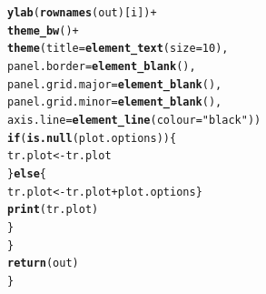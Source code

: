 \documentclass[12pt]{article}\usepackage[]{graphicx}\usepackage[]{color}
\makeatletter
\newcommand{\hlnum}[1]{\textcolor[rgb]{0.686,0.059,0.569}{#1}}%
\newcommand{\hlstr}[1]{\textcolor[rgb]{0.192,0.494,0.8}{#1}}%
\newcommand{\hlopt}[1]{\textcolor[rgb]{0,0,0}{#1}}%
\newcommand{\hlstd}[1]{\textcolor[rgb]{0.345,0.345,0.345}{#1}}%
\newcommand{\hlkwa}[1]{\textcolor[rgb]{0.161,0.373,0.58}{\textbf{#1}}}%
\newcommand{\hlkwb}[1]{\textcolor[rgb]{0.69,0.353,0.396}{#1}}%
\newcommand{\hlkwc}[1]{\textcolor[rgb]{0.333,0.667,0.333}{#1}}%
\newcommand{\hlkwd}[1]{\textcolor[rgb]{0.737,0.353,0.396}{\textbf{#1}}}%
\newenvironment{kframe}{%
 \def\at@end@of@kframe{}%
 \ifinner\ifhmode%
  \def\at@end@of@kframe{\end{minipage}}%
  \begin{minipage}{\columnwidth}%
 \fi\fi%
 \def\FrameCommand##1{\hskip\@totalleftmargin \hskip-\fboxsep
 \colorbox{shadecolor}{##1}\hskip-\fboxsep
     \hskip-\linewidth \hskip-\@totalleftmargin \hskip\columnwidth}%
 \MakeFramed {\advance\hsize-\width
   \@totalleftmargin\z@ \linewidth\hsize
   \@setminipage}}%
 {\par\unskip\endMakeFramed%
 \at@end@of@kframe}
\newenvironment{knitrout}{}{} %
\newcommand{\hlnum}[1]{\textcolor[rgb]{0.686,0.059,0.569}{#1}}%
\newcommand{\hlstr}[1]{\textcolor[rgb]{0.192,0.494,0.8}{#1}}%
\newcommand{\hlopt}[1]{\textcolor[rgb]{0,0,0}{#1}}%
\newcommand{\hlstd}[1]{\textcolor[rgb]{0.345,0.345,0.345}{#1}}%
\newcommand{\hlkwa}[1]{\textcolor[rgb]{0.161,0.373,0.58}{\textbf{#1}}}%
\newcommand{\hlkwb}[1]{\textcolor[rgb]{0.69,0.353,0.396}{#1}}%
\newcommand{\hlkwc}[1]{\textcolor[rgb]{0.333,0.667,0.333}{#1}}%
\newcommand{\hlkwd}[1]{\textcolor[rgb]{0.737,0.353,0.396}{\textbf{#1}}}%
\newenvironment{kframe}{%
 \def\at@end@of@kframe{}%
 \ifinner\ifhmode%
  \def\at@end@of@kframe{\end{minipage}}%
  \begin{minipage}{\columnwidth}%
 \fi\fi%
 \def\FrameCommand##1{\hskip\@totalleftmargin \hskip-\fboxsep
 \colorbox{shadecolor}{##1}\hskip-\fboxsep
     \hskip-\linewidth \hskip-\@totalleftmargin \hskip\columnwidth}%
 \MakeFramed {\advance\hsize-\width
   \@totalleftmargin\z@ \linewidth\hsize
   \@setminipage}}%
 {\par\unskip\endMakeFramed%
 \at@end@of@kframe}
\newenvironment{knitrout}{}{} %
\makeatother
\begin{document}
\begin{knitrout}
\begin{kframe}
\begin{alltt}
        \hlkwd{ylab}\hlstd{(}\hlkwd{rownames}\hlstd{(out)[i])} \hlopt{+}
        \hlkwd{theme_bw}\hlstd{()} \hlopt{+}
          \hlkwd{theme}\hlstd{(}\hlkwc{title} \hlstd{=} \hlkwd{element_text}\hlstd{(}\hlkwc{size} \hlstd{=} \hlnum{10}\hlstd{),}
                \hlkwc{panel.border} \hlstd{=} \hlkwd{element_blank}\hlstd{(),}
                \hlkwc{panel.grid.major} \hlstd{=} \hlkwd{element_blank}\hlstd{(),}
                \hlkwc{panel.grid.minor} \hlstd{=} \hlkwd{element_blank}\hlstd{(),}
                \hlkwc{axis.line} \hlstd{=} \hlkwd{element_line}\hlstd{(}\hlkwc{colour} \hlstd{=} \hlstr{"black"}\hlstd{))}
      \hlkwa{if}\hlstd{(}\hlkwd{is.null}\hlstd{(plot.options))\{}
        \hlstd{tr.plot} \hlkwb{<-} \hlstd{tr.plot}
        \hlstd{\}} \hlkwa{else} \hlstd{\{}
          \hlstd{tr.plot} \hlkwb{<-} \hlstd{tr.plot} \hlopt{+} \hlstd{plot.options\}}
      \hlkwd{print}\hlstd{(tr.plot)}
    \hlstd{\}}
  \hlstd{\}}
  \hlkwd{return}\hlstd{(out)}
\hlstd{\}}
\end{alltt}
\end{kframe}
\end{knitrout}
\end{document}
